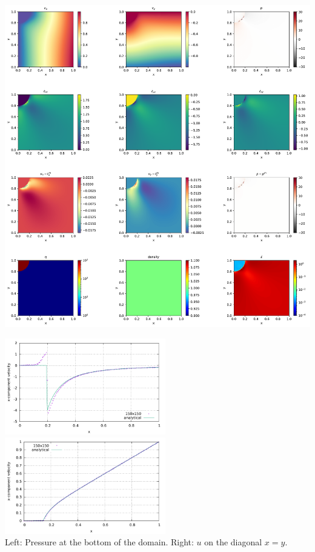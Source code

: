 \includegraphics[width=15cm]{python_codes/fieldstone_07/results/solution}

\begin{center}
\includegraphics[width=7cm]{python_codes/fieldstone_07/results/pressbottom}
\includegraphics[width=7cm]{python_codes/fieldstone_07/results/veldiag}\\
{\captionfont Left: Pressure at the bottom of the domain. Right: $u$ on the diagonal $x=y$.}
\end{center}

